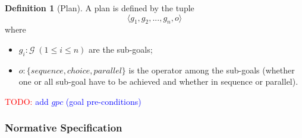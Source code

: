 \documentclass{article}
\newcommand{\todo}[1]{\textcolor{red}{TODO: }\textcolor{blue}{#1}}
\newcommand{\set}[1]{\mathcal{#1}}
\theoremstyle{definition} \newtheorem{definition}{Definition}
\begin{document}
\begin{definition}[Plan]
  A plan is defined by the tuple
 \begin{displaymath}
    \langle g_1, g_2, ..., g_n, o \rangle
  \end{displaymath}
  where
  \begin{itemize}
  \item $g_i : \set{G} \; (1 \leq i \leq n)$ are the sub-goals;
  \item $o : \{ sequence, choice, parallel\}$ is the operator among
    the sub-goals (whether one or all sub-goal have to be achieved and
    whether in sequence or parallel).
\end{itemize}
\end{definition}

\todo{add $gpc$ (goal pre-conditions)}

\subsubsection{Normative Specification}
\end{document}
